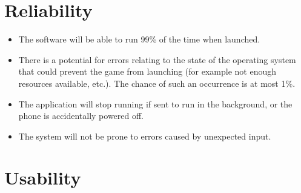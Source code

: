 \documentclass{scrreprt}
\begin{document}
\section{Reliability}

\begin{itemize}[itemsep=0.5pt]
    \item The software will be able to run 99\% of the time when launched.
    \item There is a potential for errors relating to the state of the operating system that could prevent the game from launching (for example not enough resources available, etc.). The chance of such an occurrence is at most 1\%.
    \item The application will stop running if sent to run in the background, or the phone is accidentally powered off.
    \item The system will not be prone to errors caused by unexpected input.
\end{itemize}

\section{Usability}
\end{document}
